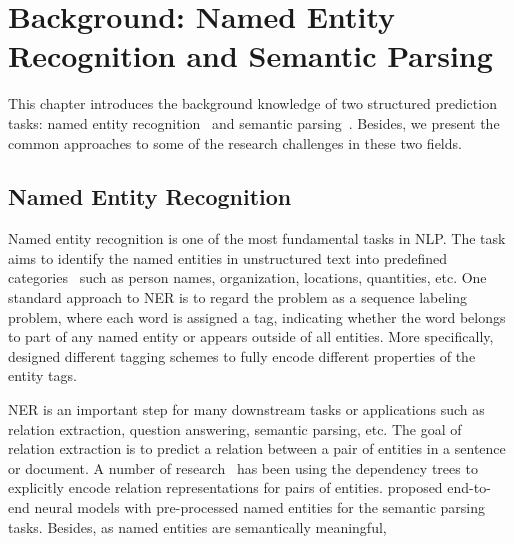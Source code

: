 
\chapter{Background: Named Entity Recognition and Semantic Parsing} %

\label{Chapter2} %


This chapter introduces the background knowledge of two structured prediction tasks: named entity recognition~\cite{yadav2018survey,li2018survey} and semantic parsing~\cite{kamath2018survey}.
Besides, we present the common approaches to some of the research challenges in these two fields. 


\section{Named Entity Recognition}

Named entity recognition is one of the most fundamental tasks in NLP. 
The task aims to identify the named entities in unstructured text into predefined categories~\cite{grishman1996message} such as person names, organization, locations, quantities, etc. 
One standard approach to NER is to regard the problem as a sequence labeling problem, where each word is assigned a tag, indicating whether the word belongs to part of any named entity or appears outside of all entities. 
More specifically, \citet{ratinov2009design} designed different tagging schemes to fully encode different properties of the entity tags.

NER is an important step for many downstream tasks or applications such as relation extraction, question answering, semantic parsing, etc.
The goal of relation extraction is to predict a relation between a pair of entities in a sentence or document. 
A number of research~\citet{miwa2016end,xu2016improved} has been using the dependency trees to explicitly encode relation representations for pairs of entities.
\citet{dong2016language,dong2018coarse} proposed end-to-end neural models with pre-processed named entities for the semantic parsing tasks. 
Besides, as named entities are semantically meaningful, 

